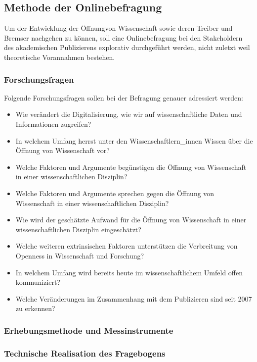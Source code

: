 \subsection{Methode der Onlinebefragung}
Um der Entwicklung der Öffnungvon Wissenschaft sowie deren Treiber und Bremser nachgehen zu können, soll eine Onlinebefragung bei den Stakeholdern des akademischen Publizierens explorativ durchgeführt werden, nicht zuletzt weil theoretische Vorannahmen bestehen.

\subsubsection{Forschungsfragen}
Folgende Forschungsfragen sollen bei der Befragung genauer adressiert werden:
\begin{itemize}
\item Wie verändert die Digitalisierung, wie wir auf wissenschaftliche Daten und Informationen zugreifen?
\item In welchem Umfang herrst unter den Wissenschaftlern_innen Wissen über die Öffnung von Wissenschaft vor? 
\item Welche Faktoren und Argumente begünstigen die Öffnung von Wissenschaft in einer wissenschaftlichen Disziplin? 
\item Welche Faktoren und Argumente sprechen gegen die Öffnung von Wissenschaft in einer wissenschaftlichen Disziplin? 
\item Wie wird der geschätzte Aufwand für die Öffnung von Wissenschaft in einer wissenschaftlichen Disziplin eingeschätzt?
\item Welche weiteren extrinsischen Faktoren unterstützen die Verbreitung von Openness in Wissenschaft und Forschung? 
\item In welchem Umfang wird bereits heute im wissenschaftlichem Umfeld offen kommuniziert?
\item Welche Veränderungen im Zusammenhang mit dem Publizieren sind seit 2007 zu erkennen?
\end{itemize}

\subsubsection{Erhebungsmethode und Messinstrumente}
\subsubsection{Technische Realisation des Fragebogens}